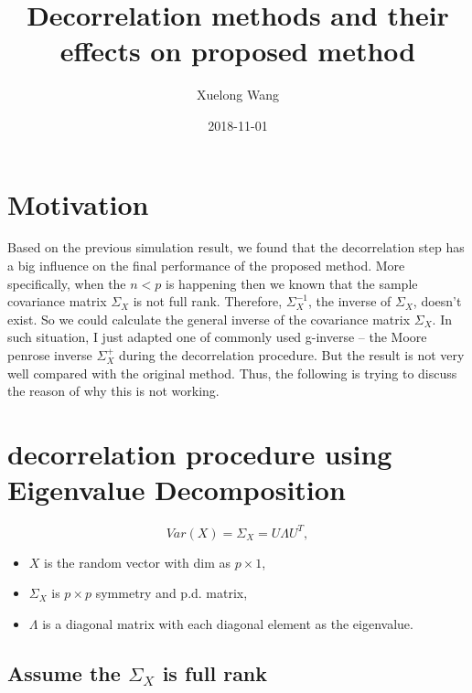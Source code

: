 \documentclass[]{article}
\title{Decorrelation methods and their effects on proposed method}
\author{Xuelong Wang}
\date{2018-11-01}
\providecommand{\tightlist}{%
  \setlength{\itemsep}{0pt}\setlength{\parskip}{0pt}}
\begin{document}
\maketitle

{
\setcounter{tocdepth}{2}
\tableofcontents
}
\section{Motivation}\label{motivation}

Based on the previous simulation result, we found that the decorrelation
step has a big influence on the final performance of the proposed
method. More specifically, when the \(n<p\) is happening then we known
that the sample covariance matrix \(\Sigma_{X}\) is not full rank.
Therefore, \(\Sigma^{-1}_X\), the inverse of \(\Sigma_{X}\), doesn't
exist. So we could calculate the general inverse of the covariance
matrix \(\Sigma_{X}\). In such situation, I just adapted one of commonly
used g-inverse -- the Moore penrose inverse \(\Sigma^{+}_X\) during the
decorrelation procedure. But the result is not very well compared with
the original method. Thus, the following is trying to discuss the reason
of why this is not working.

\section{decorrelation procedure using Eigenvalue
Decomposition}\label{decorrelation-procedure-using-eigenvalue-decomposition}

\[
  Var(X) = \Sigma_X = U\Lambda U^T,
\]

\begin{itemize}
\tightlist
\item
  \(X\) is the random vector with dim as \(p \times 1\),\\
\item
  \(\Sigma_X\) is \(p \times p\) symmetry and p.d. matrix,\\
\item
  \(\Lambda\) is a diagonal matrix with each diagonal element as the
  eigenvalue.
\end{itemize}

\subsection{\texorpdfstring{Assume the \(\Sigma_X\) is full
rank}{Assume the \textbackslash{}Sigma\_X is full rank}}\label{assume-the-sigma_x-is-full-rank}
\end{document}
